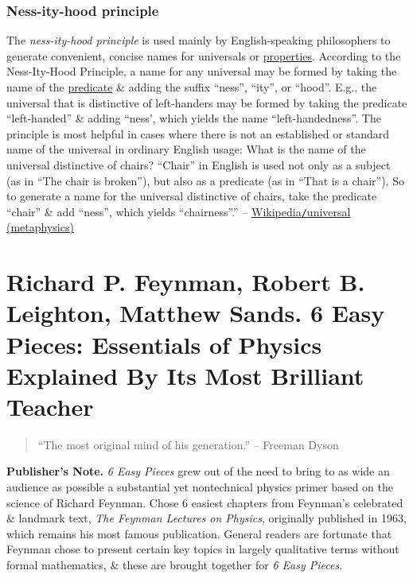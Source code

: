 \documentclass{article}
\begin{document}
\subsubsection{Ness-ity-hood principle}
The {\it ness-ity-hood principle} is used mainly by English-speaking philosophers to generate convenient, concise names for universals or \href{https://en.wikipedia.org/wiki/Property_(philosophy)}{properties}. According to the Ness-Ity-Hood Principle, a name for any universal may be formed by taking the name of the \href{https://en.wikipedia.org/wiki/Predicate_(grammar)}{predicate} \& adding the suffix ``ness'', ``ity'', or ``hood''. E.g., the universal that is distinctive of left-handers may be formed by taking the predicate ``left-handed'' \& adding ``ness', which yields the name ``left-handedness''. The principle is most helpful in cases where there is not an established or standard name of the universal in ordinary English usage: What is the name of the universal distinctive of chairs? ``Chair'' in English is used not only as a subject (as in ``The chair is broken''), but also as a predicate (as in ``That is a chair''). So to generate a name for the universal distinctive of chairs, take the predicate ``chair'' \& add ``ness'', which yields ``chairness''.'' -- \href{https://en.wikipedia.org/wiki/Universal_(metaphysics)}{Wikipedia{\tt/}universal (metaphysics)}


\section{{\sc Richard P. Feynman, Robert B. Leighton, Matthew Sands}. 6 Easy Pieces: Essentials of Physics Explained By Its Most Brilliant Teacher}

\begin{quote}
	``The most original mind of his generation.'' -- {\sc Freeman Dyson}
\end{quote}
{\bf Publisher's Note.} {\it6 Easy Pieces} grew out of the need to bring to as wide an audience as possible a substantial yet nontechnical physics primer based on the science of {\sc Richard Feynman}. Chose 6 easiest chapters from {\sc Feynman}'s celebrated \& landmark text, {\it The Feynman Lectures on Physics}, originally published in 1963, which remains his most famous publication. General readers are fortunate that {\sc Feynman} chose to present certain key topics in largely qualitative terms without formal mathematics, \& these are brought together for {\it6 Easy Pieces}.
\end{document}
